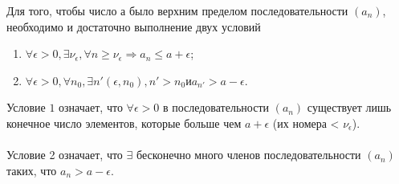 \begin{theorem}
	Для того, чтобы число а было верхним пределом последовательности $(a_n)$, необходимо и достаточно выполнение двух условий
	\begin{enumerate}
		\item $\forall \epsilon > 0, \exists \nu_\epsilon, \forall n \ge \nu_\epsilon \Rightarrow a_n \le a + \epsilon$;
		\item $\forall \epsilon > 0, \forall n_0, \exists n'(\epsilon, n_0), n'> n_0 и a_{n'} > a - \epsilon$.
	\end{enumerate}
	Условие $1$ означает, что $\forall \epsilon > 0$ в последовательности $(a_n)$ существует лишь конечное число элементов, которые больше чем $a + \epsilon$ (их номера < $\nu_\epsilon$).\\\\
	Условие 2 означает, что $\exists$ бесконечно много членов последовательности $(a_n)$ таких, что $a_n > a - \epsilon$.\\
\end{theorem}
